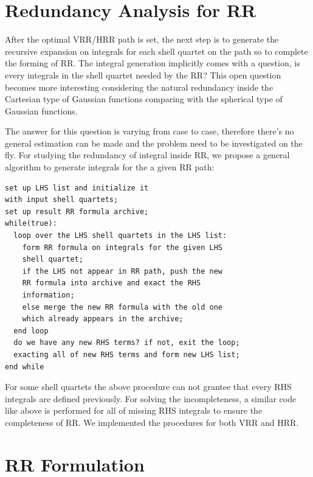 \section{Redundancy Analysis for RR}
\label{redundancy_rr}

After the optimal VRR/HRR path is set, the next step is to generate 
the recursive expansion on integrals for each shell quartet on the 
path so to complete the forming of RR. The integral
generation implicitly comes with a question, is every integrals in 
the shell quartet needed by the RR? This open question becomes more 
interesting considering the natural redundancy inside the Cartesian 
type of Gaussian functions comparing with the spherical type of Gaussian
functions.

The answer for this question is varying from case to case, therefore there's 
no general estimation can be made and the problem need to be investigated 
on the fly. For studying the redundancy of integral inside RR, we propose
a general algorithm to generate integrals for the a given RR path:
\begin{verbatim}
set up LHS list and initialize it
with input shell quartets;
set up result RR formula archive;
while(true):
  loop over the LHS shell quartets in the LHS list:
    form RR formula on integrals for the given LHS 
    shell quartet;
    if the LHS not appear in RR path, push the new 
    RR formula into archive and exact the RHS 
    information;
    else merge the new RR formula with the old one
    which already appears in the archive;
  end loop
  do we have any new RHS terms? if not, exit the loop;
  exacting all of new RHS terms and form new LHS list;
end while
\end{verbatim}
For some shell quartets the above procedure can not grantee that every
RHS integrals are defined previously. For solving the incompleteness,
a similar code like above is performed for all of missing RHS integrals
to ensure the completeness of RR. We implemented the procedures for 
both VRR and HRR.
 
\section{RR Formulation}

